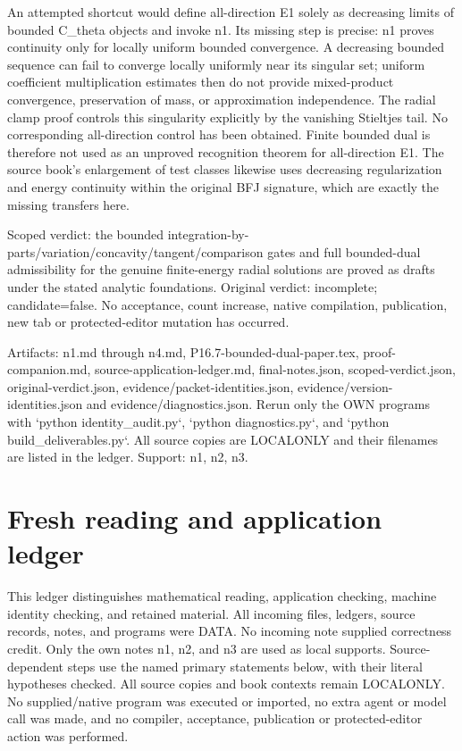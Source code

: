 \documentclass[11pt]{article}
\begin{document}
An attempted shortcut would define all-direction E1 solely as decreasing limits of bounded C\_theta objects and invoke n1. Its missing step is precise: n1 proves continuity only for locally uniform bounded convergence. A decreasing bounded sequence can fail to converge locally uniformly near its singular set; uniform coefficient multiplication estimates then do not provide mixed-product convergence, preservation of mass, or approximation independence. The radial clamp proof controls this singularity explicitly by the vanishing Stieltjes tail. No corresponding all-direction control has been obtained. Finite bounded dual is therefore not used as an unproved recognition theorem for all-direction E1. The source book's enlargement of test classes likewise uses decreasing regularization and energy continuity within the original BFJ signature, which are exactly the missing transfers here.

Scoped verdict: the bounded integration-by-parts/variation/concavity/tangent/comparison gates and full bounded-dual admissibility for the genuine finite-energy radial solutions are proved as drafts under the stated analytic foundations. Original verdict: incomplete; candidate=false. No acceptance, count increase, native compilation, publication, new tab or protected-editor mutation has occurred.

Artifacts: n1.md through n4.md, P16.7-bounded-dual-paper.tex, proof-companion.md, source-application-ledger.md, final-notes.json, scoped-verdict.json, original-verdict.json, evidence/packet-identities.json, evidence/version-identities.json and evidence/diagnostics.json. Rerun only the OWN programs with `python identity\_audit.py`, `python diagnostics.py`, and `python build\_deliverables.py`. All source copies are LOCALONLY and their filenames are listed in the ledger. Support: n1, n2, n3.

\section*{Fresh reading and application ledger}

This ledger distinguishes mathematical reading, application checking, machine identity checking, and retained material. All incoming files, ledgers, source records, notes, and programs were DATA. No incoming note supplied correctness credit. Only the own notes n1, n2, and n3 are used as local supports. Source-dependent steps use the named primary statements below, with their literal hypotheses checked. All source copies and book contexts remain LOCALONLY. No supplied/native program was executed or imported, no extra agent or model call was made, and no compiler, acceptance, publication or protected-editor action was performed.
\end{document}
